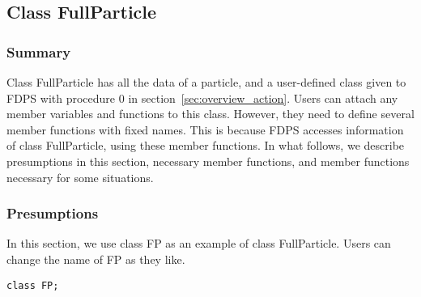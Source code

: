 \subsection{Class FullParticle}
\label{sec:example_fullparticle}

\subsubsection{Summary}


Class FullParticle has all the data of a particle, and a user-defined
class given to FDPS with procedure 0 in
section~\ref{sec:overview_action}. Users can attach any member
variables and functions to this class. However, they need to define
several member functions with fixed names. This is because FDPS
accesses information of class FullParticle, using these member
functions. In what follows, we describe presumptions in this section,
necessary member functions, and member functions necessary for some
situations.

\subsubsection{Presumptions}

In this section, we use class FP as an example of class
FullParticle. Users can change the name of FP as they like.
\begin{screen}
\begin{verbatim}
class FP;
\end{verbatim}
\end{screen}

